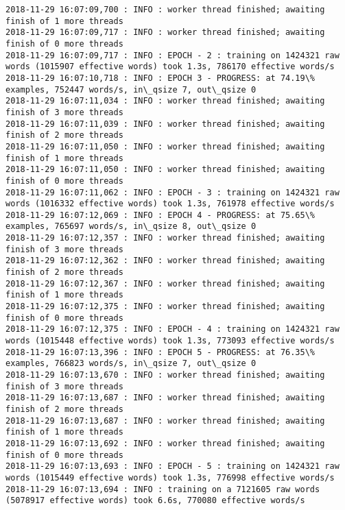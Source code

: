\documentclass[11pt]{article}
\begin{document}
\begin{Verbatim}[commandchars=\\\{\}]
2018-11-29 16:07:09,700 : INFO : worker thread finished; awaiting finish of 1 more threads
2018-11-29 16:07:09,717 : INFO : worker thread finished; awaiting finish of 0 more threads
2018-11-29 16:07:09,717 : INFO : EPOCH - 2 : training on 1424321 raw words (1015907 effective words) took 1.3s, 786170 effective words/s
2018-11-29 16:07:10,718 : INFO : EPOCH 3 - PROGRESS: at 74.19\% examples, 752447 words/s, in\_qsize 7, out\_qsize 0
2018-11-29 16:07:11,034 : INFO : worker thread finished; awaiting finish of 3 more threads
2018-11-29 16:07:11,039 : INFO : worker thread finished; awaiting finish of 2 more threads
2018-11-29 16:07:11,050 : INFO : worker thread finished; awaiting finish of 1 more threads
2018-11-29 16:07:11,050 : INFO : worker thread finished; awaiting finish of 0 more threads
2018-11-29 16:07:11,062 : INFO : EPOCH - 3 : training on 1424321 raw words (1016332 effective words) took 1.3s, 761978 effective words/s
2018-11-29 16:07:12,069 : INFO : EPOCH 4 - PROGRESS: at 75.65\% examples, 765697 words/s, in\_qsize 8, out\_qsize 0
2018-11-29 16:07:12,357 : INFO : worker thread finished; awaiting finish of 3 more threads
2018-11-29 16:07:12,362 : INFO : worker thread finished; awaiting finish of 2 more threads
2018-11-29 16:07:12,367 : INFO : worker thread finished; awaiting finish of 1 more threads
2018-11-29 16:07:12,375 : INFO : worker thread finished; awaiting finish of 0 more threads
2018-11-29 16:07:12,375 : INFO : EPOCH - 4 : training on 1424321 raw words (1015448 effective words) took 1.3s, 773093 effective words/s
2018-11-29 16:07:13,396 : INFO : EPOCH 5 - PROGRESS: at 76.35\% examples, 766823 words/s, in\_qsize 7, out\_qsize 0
2018-11-29 16:07:13,670 : INFO : worker thread finished; awaiting finish of 3 more threads
2018-11-29 16:07:13,687 : INFO : worker thread finished; awaiting finish of 2 more threads
2018-11-29 16:07:13,687 : INFO : worker thread finished; awaiting finish of 1 more threads
2018-11-29 16:07:13,692 : INFO : worker thread finished; awaiting finish of 0 more threads
2018-11-29 16:07:13,693 : INFO : EPOCH - 5 : training on 1424321 raw words (1015449 effective words) took 1.3s, 776998 effective words/s
2018-11-29 16:07:13,694 : INFO : training on a 7121605 raw words (5078917 effective words) took 6.6s, 770080 effective words/s

    \end{Verbatim}
\end{document}
